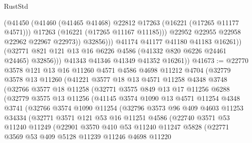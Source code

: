 \begin{lexlean}{RustStd}
\begin{coremodule}
                          (@41450
                            (@41460 (@41465 @41468) @22812 @17263 (@16221 (@17265 @11177 @4571)))
                            @17263
                            (@16221 (@17265 @11167 @11185)))
                          @22952
                          @22955
                          @22958
                          @22962
                          @22967
                          @22973))
                      @32856)))
                @41174
                @41177
                @41180
                @41183
                @16261))
            (@32771 @821 @121 @13 @16 @6226 @4586 (@41332 @820 @6226 @24461 @24465) @32856)))
        @41343
        @41346
        @41349
        @41352
        @16261))
@41673 := @22770
    @3578
    @121
    @13
    @16
    @11260
    @4571
    @4586
    @4698
    @11212
    @4704
    (@32779
      @3578
      @13
      @11260
      (@41221
        @3577
        @18
        @13
        @4571
        @11258
        @4348
        @3748
        (@32766
          @3577
          @18
          @11258
          (@32771
            @3575
            @849
            @13
            @17
            @11256
            @6288
            (@32779
              @3575
              @13
              @11256
              (@41145
                @3574
                @1090
                @13
                @4571
                @11254
                @4348
                @3741
                (@32766
                  @3574
                  @1090
                  @11254
                  (@32796
                    @3573
                    @96
                    @409
                    @4603
                    @11253
                    @34334
                    (@32771
                      @3571
                      @121
                      @53
                      @16
                      @11251
                      @4586
                      (@22740
                        @3571
                        @53
                        @11240
                        @11249
                        (@22901
                          @3570
                          @410
                          @53
                          @11240
                          @11247
                          @5828
                          (@22771
                            @3569
                            @53
                            @409
                            @5128
                            @11239
                            @11246
                            @4698
                            @11220

\end{coremodule}
\end{lexlean}
